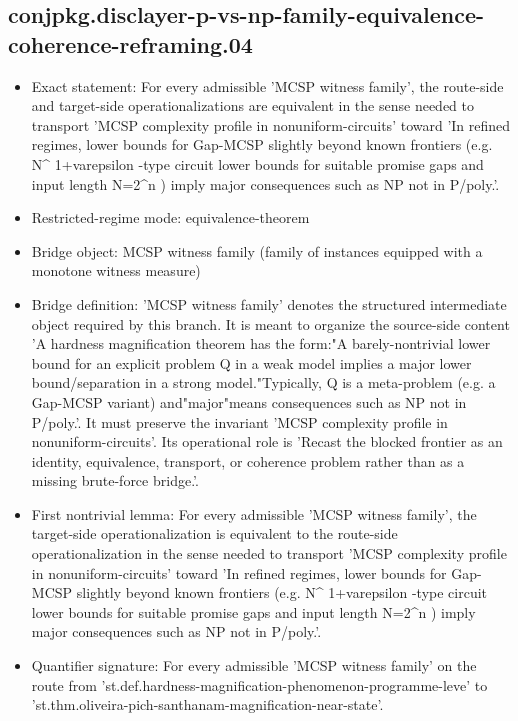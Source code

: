 \documentclass[11pt]{article}
\begin{document}
\subsection*{conjpkg.disclayer-p-vs-np-family-equivalence-coherence-reframing.04}
\begin{itemize}
\item Exact statement: For every admissible 'MCSP witness family', the route-side and target-side operationalizations are equivalent in the sense needed to transport 'MCSP complexity profile in nonuniform-circuits' toward 'In refined regimes, lower bounds for Gap-MCSP slightly beyond known frontiers (e.g. N\textasciicircum{} 1+varepsilon -type circuit lower bounds for suitable promise gaps and input length N=2\textasciicircum{}n ) imply major consequences such as NP not in P/poly.'.
\item Restricted-regime mode: equivalence-theorem
\item Bridge object: MCSP witness family (family of instances equipped with a monotone witness measure)
\item Bridge definition: 'MCSP witness family' denotes the structured intermediate object required by this branch. It is meant to organize the source-side content 'A hardness magnification theorem has the form:"A barely-nontrivial lower bound for an explicit problem Q in a weak model implies a major lower bound/separation in a strong model."Typically, Q is a meta-problem (e.g. a Gap-MCSP variant) and"major"means consequences such as NP not in P/poly.'. It must preserve the invariant 'MCSP complexity profile in nonuniform-circuits'. Its operational role is 'Recast the blocked frontier as an identity, equivalence, transport, or coherence problem rather than as a missing brute-force bridge.'.
\item First nontrivial lemma: For every admissible 'MCSP witness family', the target-side operationalization is equivalent to the route-side operationalization in the sense needed to transport 'MCSP complexity profile in nonuniform-circuits' toward 'In refined regimes, lower bounds for Gap-MCSP slightly beyond known frontiers (e.g. N\textasciicircum{} 1+varepsilon -type circuit lower bounds for suitable promise gaps and input length N=2\textasciicircum{}n ) imply major consequences such as NP not in P/poly.'.
\item Quantifier signature: For every admissible 'MCSP witness family' on the route from 'st.def.hardness-magnification-phenomenon-programme-leve' to 'st.thm.oliveira-pich-santhanam-magnification-near-state'.

\end{itemize}
\end{document}
